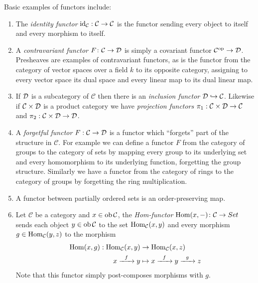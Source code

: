 \documentclass[a4paper,openany]{scrbook}
\renewcommand{\C}{\mathcal C}
\begin{document}
\begin{example}
Basic examples of functors include:
\begin{enumerate}[label=\alph*)]
\item The \emph{identity functor} $\id_\C : \C \to \C$ is the functor sending every object to itself and every morphism to itself.
\item A \emph{contravariant functor} $F\colon \C \to \D$ is simply a covariant functor $\C^\op \to \D$. Presheaves are examples of contravariant functors, as is the functor from the category of vector spaces over a field $k$ to its opposite category, assigning to every vector space its dual space and every linear map to its dual linear map. 
\item If $\mathcal D$ is a subcategory of $\C$ then there is an \emph{inclusion functor} $\D \hookrightarrow \C$. Likewise if $\C \times \D$ is a product category we have \emph{projection functors} $\pi_1 : \C \times \D \to \C$ and $\pi_2 : \C \times \D \to \D$.
\item A \emph{forgetful functor} $F:\C \to \D$ is a functor which ``forgets'' part of the structure in $\C$. For example we can define a functor $F$ from the category of groups to the category of sets by mapping every group to its underlying set and every homomorphism to its underlying function, forgetting the group structure. Similarly we have a functor from the category of rings to the category of groups by forgetting the ring multiplication. 
\item A functor between partially ordered sets is an order-preserving map.
\item Let $\C$ be a category and $x \in \ob \C$, the \emph{Hom-functor} $\Hom(x, -)\colon\C \to \\Set$ sends each object $y \in \ob \C$ to the set $\Hom_{\C}(x,y)$ and every morphism $g \in \Hom_{\C}(y,z)$ to the morphism 
\begin{align*}
\displaystyle \Hom(x,g): \Hom_{\C}(x,y) &\to \Hom_{\C}(x,z) \\
x \xrightarrow{\hspace{0.2cm} f \hspace{0.2cm}} y &\mapsto x \xrightarrow{\hspace{0.2cm} f \hspace{0.2cm}} y \xrightarrow{\hspace{0.2cm} g \hspace{0.2cm}} z
\end{align*}
Note that this functor simply post-composes morphisms with $g$.
\end{enumerate}
\end{example}
\end{document}
